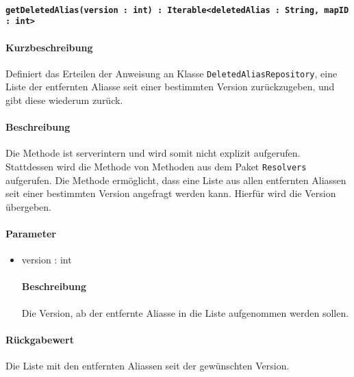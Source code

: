 \paragraph*{\texttt{getDeletedAlias(version : int) : Iterable<deletedAlias : String, mapID : int>}}%
\paragraph*{Kurzbeschreibung}
Definiert das Erteilen der Anweisung an Klasse \texttt{DeletedAliasRepository}, eine Liste der entfernten Aliasse seit einer bestimmten Version zurückzugeben, und gibt diese wiederum zurück.
\paragraph*{Beschreibung}
Die Methode ist serverintern und wird somit nicht explizit aufgerufen.
Stattdessen wird die Methode von Methoden aus dem Paket \texttt{Resolvers} aufgerufen.
Die Methode ermöglicht, dass eine Liste aus allen entfernten Aliassen seit einer bestimmten Version angefragt werden kann.
Hierfür wird die Version übergeben.
\paragraph*{Parameter}
\begin{itemize}
    \item version : int
    		\paragraph*{Beschreibung}
    		Die Version, ab der entfernte Aliasse in die Liste aufgenommen werden sollen.
\end{itemize}
\paragraph*{Rückgabewert}
Die Liste mit den entfernten Aliassen seit der gewünschten Version.
